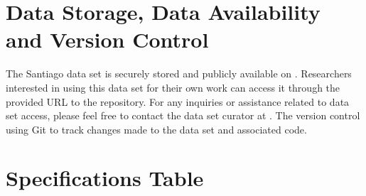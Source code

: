 \documentclass[
11pt, %
oneside, %
english, %
singlespacing, %
]{macthesis} %
\begin{document}
\hypertarget{data-storage-data-availability-and-version-control}{%
\section{Data Storage, Data Availability and Version Control}\label{data-storage-data-availability-and-version-control}}

The Santiago data set is securely stored and publicly available on . Researchers interested in using this data set for their own work can access it through the provided URL to the repository. For any inquiries or assistance related to data set access, please feel free to contact the data set curator at . The version control using Git to track changes made to the data set and associated code.

\hypertarget{specifications-table}{%
\section{Specifications Table}\label{specifications-table}}
\end{document}
